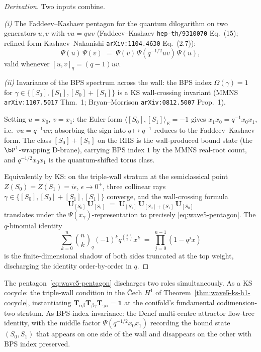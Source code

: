 \begin{proof}[Derivation]
Two inputs combine.

\emph{(i)} The Faddeev--Kashaev pentagon for the quantum dilogarithm
on two generators $u, v$ with $v u = q u v$ (Faddeev--Kashaev
\texttt{hep-th/9310070} Eq.~(15); refined form Kashaev--Nakanishi
\texttt{arXiv:1104.4630} Eq.~(2.7)):
\[
  \Psi(u)\, \Psi(v) \;=\; \Psi(v)\, \Psi(q^{-1/2} u v)\, \Psi(u),
\]
valid whenever $[u, v]_q = (q - 1) u v$.

\emph{(ii)} Invariance of the BPS spectrum across the wall: the BPS
index $\Omega(\gamma) = 1$ for $\gamma \in \{[S_0], [S_1], [S_0] +
[S_1]\}$ is a KS wall-crossing invariant (MMNS
\texttt{arXiv:1107.5017} Thm.~1; Bryan--Morrison
\texttt{arXiv:0812.5007} Prop.~1).

Setting $u = x_0$, $v = x_1$: the Euler form $\langle [S_0], [S_1]
\rangle_E = -1$ gives $x_1 x_0 = q^{-1} x_0 x_1$, i.e.\ $v u = q^{-1}
u v$; absorbing the sign into $q \mapsto q^{-1}$ reduces to the
Faddeev--Kashaev form. The class $[S_0] + [S_1]$ on the RHS is the
wall-produced bound state (the $\bP^1$-wrapping D-brane), carrying
BPS index $1$ by the MMNS real-root count, and $q^{-1/2} x_0 x_1$ is
the quantum-shifted torus class.

Equivalently by KS: on the triple-wall stratum at the semiclassical
point $Z(S_0) = Z(S_1) = i\epsilon$, $\epsilon \to 0^+$, three
collinear rays $\gamma \in \{[S_0], [S_0]+[S_1], [S_1]\}$ converge,
and the wall-crossing formula
\[
  \mathbf{U}_{[S_0]}\, \mathbf{U}_{[S_1]}
  \;=\; \mathbf{U}_{[S_1]}\, \mathbf{U}_{[S_0]+[S_1]}\, \mathbf{U}_{[S_0]}
\]
translates under the $\Psi(x_\gamma)$-representation to precisely
\eqref{eq:wave5-pentagon}. The $q$-binomial identity
\[
  \sum_{k=0}^n \binom{n}{k}_{\!q} (-1)^k q^{\binom{k}{2}} x^k
  \;=\; \prod_{j=0}^{n-1}(1 - q^j x)
\]
is the finite-dimensional shadow of both sides truncated at the top
weight, discharging the identity order-by-order in $q$.
\end{proof}

\begin{remark}
\label{rem:wave5-pentagon-cocycle}
The pentagon~\eqref{eq:wave5-pentagon} discharges two roles
simultaneously. As a KS cocycle: the triple-wall condition in the
\v{C}ech $H^1$ of Theorem~\ref{thm:wave5-ks-h1-cocycle},
instantiating $\mathbf{T}_{\alpha\beta} \mathbf{T}_{\beta\gamma}
\mathbf{T}_{\gamma\alpha} = \mathbf{1}$ at the conifold's fundamental
codimension-two stratum. As BPS-index invariance: the Denef
multi-centre attractor flow-tree identity, with the middle factor
$\Psi(q^{-1/2} x_0 x_1)$ recording the bound state $(S_0, S_1)$ that
appears on one side of the wall and disappears on the other with BPS
index preserved.
\end{remark}

